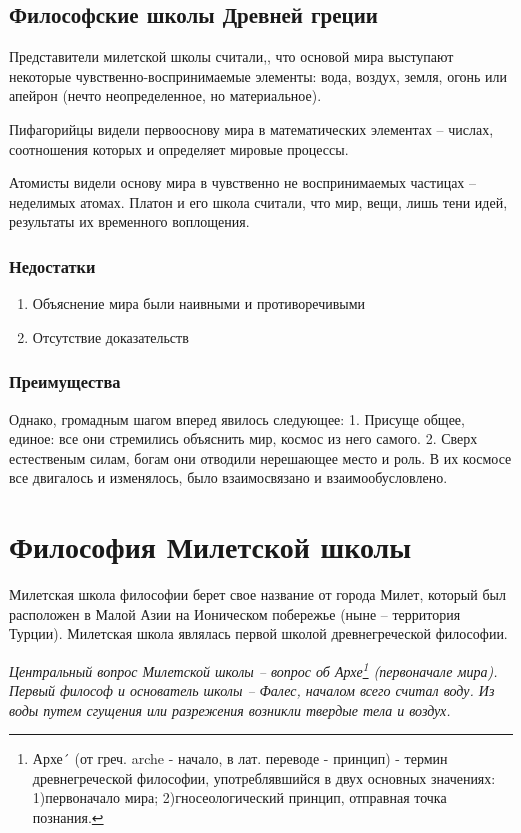 \documentclass[a4paper, 14pt]{extreport}
\begin{document}
\subsection{Философские школы Древней греции}

Представители милетской школы считали,, что основой мира выступают
некоторые чувственно-воспринимаемые элементы: вода, воздух, земля, огонь
или апейрон (нечто неопределенное, но материальное).

Пифагорийцы видели первооснову мира в математических элементах --
числах, соотношения которых и определяет мировые процессы.

Атомисты видели основу мира в чувственно не воспринимаемых частицах --
неделимых атомах. Платон и его школа считали, что мир, вещи, лишь тени
идей, результаты их временного воплощения.

\subsubsection{Недостатки}

\begin{enumerate}
\def\labelenumi{\arabic{enumi}.}

\item
  Объяснение мира были наивными и противоречивыми
\item
  Отсутствие доказательств
\end{enumerate}

\subsubsection{Преимущества}

Однако, громадным шагом вперед явилось следующее: 1. Присуще общее,
единое: все они стремились объяснить мир, космос из него самого. 2.
Сверх естественым силам, богам они отводили нерешающее место и роль. В
их космосе все двигалось и изменялось, было взаимосвязано и
взаимообусловлено.

\section{Философия Милетской школы}

Милетская школа философии берет свое название от города Милет, который
был расположен в Малой Азии на Ионическом побережье (ныне -- территория
Турции). Милетская школа являлась первой школой древнегреческой
философии.

\emph{Центральный вопрос Милетской школы -- вопрос об Архе\footnote{Архе´
  (от греч. arche - начало, в лат. переводе - принцип) - термин
  древнегреческой философии, употреблявшийся в двух основных значениях:
  1)первоначало мира; 2)гносеологический принцип, отправная точка
  познания.} (первоначале мира). Первый философ и основатель школы --
Фалес, началом всего считал воду. Из воды путем сгущения или разрежения
возникли твердые тела и воздух.}
\end{document}
